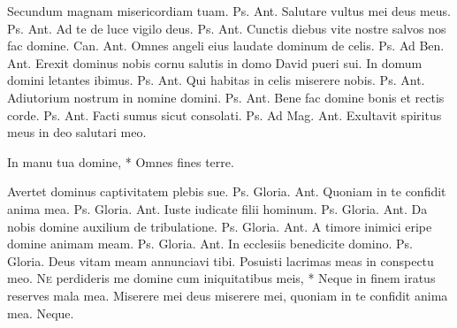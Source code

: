 \begin{multicols*}{2}
\begin{responsory-doxology}
\end{responsory-doxology}
 Secundum magnam misericordiam tuam. {\color{Red} Ps.}  {\color{Red} Ant.} Salutare vultus mei deus meus. {\color{Red} Ps.}  {\color{Red} Ant.} Ad te de luce vigilo deus. {\color{Red} Ps.}  {\color{Red} Ant.} Cunctis diebus vite nostre salvos nos fac domine. {\color{Red} Can.}  {\color{Red} Ant.} Omnes angeli eius laudate dominum de celis. {\color{Red} Ps.}  {\color{Red} Ad Ben. Ant.} Erexit dominus nobis cornu salutis in domo David pueri sui.
 In domum domini letantes ibimus. {\color{Red} Ps.}  {\color{Red} Ant.} Qui habitas in celis miserere nobis. {\color{Red} Ps.}  {\color{Red} Ant.} Adiutorium nostrum in nomine domini. {\color{Red} Ps.}  {\color{Red} Ant.} Bene fac domine bonis et rectis corde. {\color{Red} Ps.}  {\color{Red} Ant.} Facti sumus sicut consolati. {\color{Red} Ps.}  {\color{Red} Ad Mag. Ant.} Exultavit spiritus meus in deo salutari meo.
{\color{Red} }
\par {}
\begin{invitatory}
{In manu tua domine, * Omnes fines terre.}
\end{invitatory}
 Avertet dominus captivitatem plebis sue. {\color{Red} Ps.}   Gloria. {\color{Red} Ant.} Quoniam in te confidit anima mea. {\color{Red} Ps.}   Gloria. {\color{Red} Ant.} Iuste iudicate filii hominum. {\color{Red} Ps.}   Gloria. {\color{Red} Ant.} Da nobis domine auxilium de tribulatione. {\color{Red} Ps.}   Gloria. {\color{Red} Ant.} A timore inimici eripe domine animam meam. {\color{Red} Ps.}   Gloria. {\color{Red} Ant.} In ecclesiis benedicite domino. {\color{Red} Ps.}   Gloria. \V Deus vitam meam annunciavi tibi. \R Posuisti lacrimas meas in conspectu meo. \R
\lettrine[lines=2]{\zallmancaps \color{Red} N}{e} \hypertarget{ne-perdideris}{\label{ne-perdideris}} perdideris me domine cum iniquitatibus meis, * Neque in finem iratus reserves mala mea. \V Miserere mei deus miserere mei, quoniam in te confidit anima mea. Neque.


\end{multicols*}
